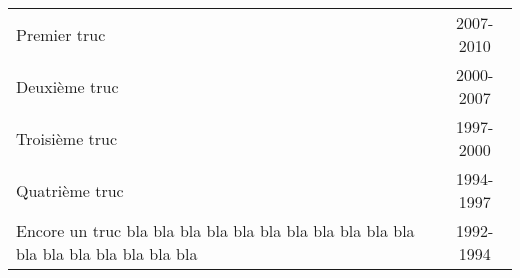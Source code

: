 \documentclass{article}
\begin{document}
\begin{tabular}{@{--~}p{}c@{}}
	Premier truc                                & 2007-2010 \\
	Deuxième truc                               & 2000-2007 \\
	Troisième truc                              & 1997-2000 \\
	Quatrième truc                              & 1994-1997 \\
	Encore un truc bla bla bla bla bla bla bla
	bla bla bla bla bla bla bla bla bla bla bla & 1992-1994 \\
\end{tabular}
\end{document}
